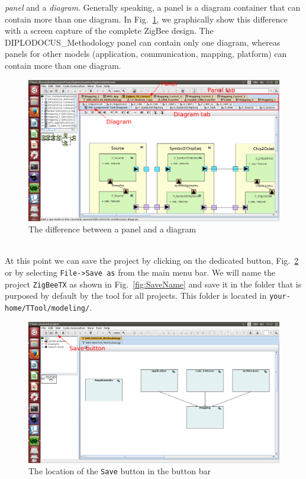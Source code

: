 \documentclass{llncs}
\newcommand{\screenshotsize}{1.0\textwidth}
\begin{document}
\textit{panel} and a \textit{diagram}. Generally speaking, a panel is a diagram container that can contain more than one
diagram. In Fig.~\ref{fig:PanelvsDiag}, we graphically show this difference with a screen capture of the complete ZigBee
design. The DIPLODOCUS\_Methodology panel can contain only one diagram, whereas panels for other models (application,
communication, mapping, platform) can contain more than one diagram.
%
\begin{figure}[htbp]
	\centering
	\includegraphics[width=\screenshotsize]{./figures/screenshot/PanelvsDiag.png}
	\caption{The difference between a panel and a diagram}
	\label{fig:PanelvsDiag}
\end{figure}
%
\\At this point we can save the project by clicking on the dedicated button, Fig.~\ref{fig:SaveButton} or by selecting
\texttt{File->Save as} from the main menu bar. We will name the project \texttt{ZigBeeTX} as shown in
Fig.~\ref{fig:SaveName} and save it in the folder that is purposed by default by the tool for all projects. This folder
is located in \texttt{your-home/TTool/modeling/}.
%
\begin{figure}[htbp]
	\centering
	\includegraphics[width=\screenshotsize]{./figures/screenshot/SaveButton.png}
	\caption{The location of the \texttt{Save} button in the button bar}
	\label{fig:SaveButton}
\end{figure}
\end{document}
